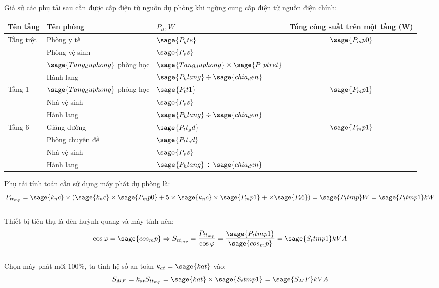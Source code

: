 \documentclass[12pt,a4paper]{article}
\begin{document}
Giả sử các phụ tải sau cần được cấp điện từ nguồn dự phòng khi ngừng cung cấp điện từ nguồn điện chính:
\begin{center}
\begin{tabular}{|l|l|l|c|}\hline
\textbf{Tên tầng} & \textbf{Tên phòng} & \textbf{$P_{tt},W$} & Tổng công suất trên một tầng (W)\\ \hline
\multirow{4}{2cm}{Tầng trệt} & Phòng y tế & $\sage{P_yte}$ & \multirow{4}{2cm}{$\sage{P_mp0}$}\\ \cline{2-3}
& Phòng vệ sinh & $\sage{P_vs}$ & \\ \cline{2-3}
& $\sage{Tang_duphong}$ phòng học & $\sage{Tang_duphong}\times \sage{P_1ptret}$ & \\ \cline{2-3}
& Hành lang & $\sage{P_hlang}\div \sage{chia_den}$ & \\ \hline \hline
\multirow{3}{2cm}{Tầng 1} & $\sage{Tang_duphong}$ phòng học & $\sage{P_tt1}$ & \multirow{3}{2cm}{$\sage{P_mp1}$}\\ \cline{2-3}
& Nhà vệ sinh & $\sage{P_vs}$ &\\ \cline{2-3}
& Hành lang & $\sage{P_hlang}\div \sage{chia_den}$ &\\ \hline\hline
\multirow{3}{2cm}{Tầng 6} & Giảng đường & $\sage{P_tt_gd}$ & \multirow{3}{2cm}{$\sage{P_mp1}$}\\ \cline{2-3}
& Phòng chuyên đề & $\sage{P_tt_cd}$ &\\ \cline{2-3}
& Nhà vệ sinh & $\sage{P_vs}$ &\\ \cline{2-3}
& Hành lang & $\sage{P_hlang}\div \sage{chia_den}$ &\\ \hline\hline
\end{tabular}
\end{center}

Phụ tải tính toán cần sử dụng máy phát dự phòng là: $$P_{{tt}_{mp}} = \sage{k_nc}\times\left({\sage{k_nc}\times\sage{P_mp0} + 5\times\sage{k_nc}\times \sage{P_mp1} + \times\sage{P_t6}}\right) =\sage{P_ttmp}W =  \sage{P_ttmp1}kW$$\\

Thiết bị tiêu thụ là đèn huỳnh quang và máy tính nên: $$\cos \varphi = \sage{cos_mp} \Rightarrow S_{{tt}_{mp}}=\frac{P_{{tt}_{mp}}}{\cos \varphi}=\frac{\sage{P_ttmp1}}{\sage{cos_mp}}=\sage{S_ttmp1}kVA$$\\

Chọn máy phát mới $100\%$, ta tính hệ số an toàn $k_{at} = \sage{kat}$ vào: $$S_{MF}=k_{at}S_{{tt}_{mp}}=\sage{kat} \times\sage{S_ttmp1}=\sage{S_MF}kVA$$
\end{document}
